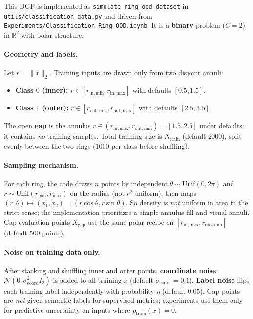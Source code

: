 This DGP is implemented as \texttt{simulate\_ring\_ood\_dataset} in \texttt{utils/classification\_data.py} and driven from \texttt{Experiments/Classification\_Ring\_OOD.ipynb}. It is a \textbf{binary} problem ($C{=}2$) in $\mathbb{R}^2$ with polar structure.

\paragraph{Geometry and labels.}
Let $r=\|x\|_2$. Training inputs are drawn only from two disjoint annuli:
\begin{itemize}
  \item \textbf{Class $0$ (inner):} $r\in[r_{\mathrm{in,min}},r_{\mathrm{in,max}}]$ with defaults $[0.5,1.5]$.
  \item \textbf{Class $1$ (outer):} $r\in[r_{\mathrm{out,min}},r_{\mathrm{out,max}}]$ with defaults $[2.5,3.5]$.
\end{itemize}
The open \textbf{gap} is the annulus $r\in(r_{\mathrm{in,max}},r_{\mathrm{out,min}})=[1.5,2.5]$ under defaults: it contains \emph{no} training samples. Total training size is $N_{\mathrm{train}}$ (default $2000$), split evenly between the two rings ($1000$ per class before shuffling).

\paragraph{Sampling mechanism.}
For each ring, the code draws $n$ points by independent $\theta\sim\mathrm{Unif}(0,2\pi)$ and $r\sim\mathrm{Unif}(r_{\min},r_{\max})$ on the radius (not $r^2$-uniform), then maps $(r,\theta)\mapsto(x_1,x_2)=(r\cos\theta,r\sin\theta)$. So density is \emph{not} uniform in area in the strict sense; the implementation prioritizes a simple annulus fill and visual annuli. Gap evaluation points $X_{\mathrm{gap}}$ use the same polar recipe on $[r_{\mathrm{in,max}},r_{\mathrm{out,min}}]$ (default $500$ points).

\paragraph{Noise on training data only.}
After stacking and shuffling inner and outer points, \textbf{coordinate noise} $\mathcal{N}(0,\sigma_{\mathrm{coord}}^2 I_2)$ is added to all training $x$ (default $\sigma_{\mathrm{coord}}=0.1$). \textbf{Label noise} flips each training label independently with probability $\eta$ (default $0.05$). Gap points are \emph{not} given semantic labels for supervised metrics; experiments use them only for predictive uncertainty on inputs where $p_{\mathrm{train}}(x)=0$.


